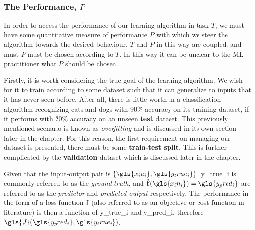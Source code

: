 

\subsubsection{The Performance, $P$\label{sec:ML-performance}}
In order to access the performance of our learning algorithm in task $T$,
we must have some quantitative measure of performance $P$ with which we steer
the algorithm towards the desired behaviour. $T$ and $P$ in this way are
coupled, and must $P$ must be chosen according to $T$. In this way it can be
unclear to the \gls{ML} practitioner what $P$ should be chosen.

Firstly, it is worth considering the true goal of the learning algorithm. We
wish for it to train according to some dataset such that it can generalize to
inputs that it has never seen before. After all, there is little worth in a
classification algorithm recognizing cats and dogs with 90\% accuracy on its
training dataset, if it performs with 20\% accuracy on an unseen \textbf{test}
dataset. This previously mentioned scenario is known as \textit{overfitting} and
is discussed in its own section later in the chapter. For this reason, the first
requirement on managing our dataset is presented, there must be some
\textbf{train-test split}. This is further complicated by the
\textbf{validation} dataset which is discussed later in the chapter.

Given that the input-output pair is $\{\gls{x_in_i}, \gls{y_true_i}\}$,
\gls{y_true_i} is commonly referred to as the \textit{ground truth}, and
$\hat{\mathbf{f}}(\gls{x_in_i})=\gls{y_pred_i}$ are referred to as the
\textit{predictor} and \textit{predicted output} respectively. The performance
in the form of a loss function \gls{J} (also referred to as an objective or cost
function in literature) is then a function of \gls{y_true_i} and
\gls{y_pred_i}, therefore $\gls{J}(\gls{y_pred_i}, \gls{y_true_i})$.

